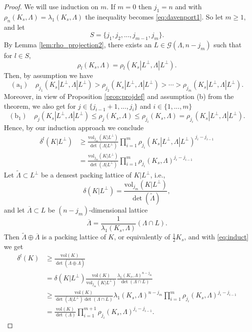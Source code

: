 \documentclass{amsart}
\theoremstyle{definition}
\theoremstyle{remark}
\numberwithin{equation}{section}
\begin{document}
\begin{proof} We will use induction on $m$. If $m=0$ then $j_1=n$ and with  $\rho_n(K_s,\Lambda)=\lambda_1(K_s,\Lambda)$ the inequality becomes   \eqref{eq:davenport1}. So let $m\geq 1 $, and  let 
 $$S=\{j_1, j_2,..., j_{m-1}, j_{m}\}.$$ By Lemma \ref{lem:rho_projection2}, there exists an $L\in\mathcal{G}(\Lambda,n-j_m)$ such that for $l\in S$,
$$\rho_l(K_s,\Lambda)=\rho_l(K_s|L^\perp,\Lambda|L^\perp).$$
Then, by assumption we have
\begin{equation*}
    \mathrm{(a_1)}\quad  \rho_{j_1}(K_s|L^\perp,\Lambda|L^\perp)>\rho_{j_2}(K_s|L^\perp,\Lambda|L^\perp)>\cdots>\rho_{j_m}(K_s|L^\perp,\Lambda|L^\perp).
\end{equation*}
Moreover, in view of Proposition \ref{prop:projdef} and assumption (b) from the theorem, we also get for $j\in\{j_{i-1}+1,..., j_i\}$ and $i\in\{1,...,m\}$
\begin{equation*}
  \mathrm{(b_1)}\quad \rho_j(K_s|L^\perp,\Lambda|L^\perp)\le\rho_j(K_s,\Lambda)\leq \rho_{j_i}(K_s,\Lambda) =\rho_{j_i}(K_s|L^\perp,\Lambda|L^\perp).
\end{equation*}
Hence, by our induction approach we conclude 
\begin{equation}
\begin{split}
    \delta^l(K|L^\perp) &\geq \frac{\mathrm{vol}_{j_m}(K|L^\perp)}{\det(\Lambda|L^\perp)}\prod_{i=1}^{m} \rho_{j_i}(K_s|L^\perp,\Lambda|L^\perp)^{j_i-j_{i-1}} \\ &= \frac{\mathrm{vol}_{j_m}(K|L^\perp)}{\det(\Lambda|L^\perp)}\prod_{i=1}^{m} \rho_{j_i}(K_s,\Lambda)^{j_i-j_{i-1}}
\label{eq:induct}    
\end{split}     
\end{equation}
Let $\widetilde\Lambda\subset L^\perp$ be a densest packing lattice of $K|L^\perp$, i.e., 
\begin{equation*} 
   \delta(K|L^\perp)=\frac{\mathrm{vol}_{j_m}(K|L^\perp)}{\det(\widetilde\Lambda)},
\end{equation*} 
and let $\overline\Lambda\subset L$ be $(n-j_m)$-dimensional lattice 
$$
\overline\Lambda=\frac{1}{\lambda_1(K_s,\Lambda)}\left(\Lambda\cap L\right).$$
Then $\widetilde\Lambda\oplus\overline \Lambda$ is a packing lattice of $K$, or equivalently of $\frac{1}{2} K_s$, and with \eqref{eq:induct} we get 
\begin{equation*}
    \begin{split}
        \delta^l(K)&\geq \frac{\mathrm{vol}(K)}{\det(\widetilde\Lambda\oplus\overline \Lambda)} \\ &= \delta(K|L^\perp)\frac{\mathrm{vol}(K)}{\mathrm{vol}_{j_m}(K|L^\perp)} \frac{\lambda_1(K_s,\Lambda)^{n-j_m}}{\det(\Lambda\cap L)} \\   
         &\geq \frac{\mathrm{vol}(K)}{\det(\Lambda|L^\perp)\det(\Lambda\cap L)}\lambda_1(K_s,\Lambda)^{n-j_m}\prod_{i=1}^{m} \rho_{j_i}(K_s,\Lambda)^{j_i-j_{i-1}} \\
         &= \frac{\mathrm{vol}(K)}{\det(\Lambda)}\prod_{i=1}^{m+1} \rho_{j_i}(K_s,\Lambda)^{j_i-j_{i-1}}.
    \end{split}
\end{equation*}
\end{proof}
\end{document}
